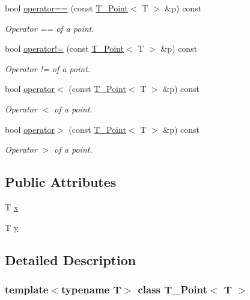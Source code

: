 \begin{DoxyCompactItemize}
\item 
bool \hyperlink{classT__Point_a83c15f53049523cc75c23350ceb4832a}{operator==} (const \hyperlink{classT__Point}{T\+\_\+\+Point}$<$ T $>$ \&p) const
\begin{DoxyCompactList}\small\item\em Operator == of a point. \end{DoxyCompactList}\item 
bool \hyperlink{classT__Point_ab92f1605c6f5008b42105b4c7a7fc1b2}{operator!=} (const \hyperlink{classT__Point}{T\+\_\+\+Point}$<$ T $>$ \&p) const
\begin{DoxyCompactList}\small\item\em Operator != of a point. \end{DoxyCompactList}\item 
bool \hyperlink{classT__Point_a95cb559fe5888b44481f6ad3aebabefe}{operator$<$} (const \hyperlink{classT__Point}{T\+\_\+\+Point}$<$ T $>$ \&p) const
\begin{DoxyCompactList}\small\item\em Operator $<$ of a point. \end{DoxyCompactList}\item 
bool \hyperlink{classT__Point_a0a9956de8ab7c8dccf35b78c43aedefd}{operator$>$} (const \hyperlink{classT__Point}{T\+\_\+\+Point}$<$ T $>$ \&p) const
\begin{DoxyCompactList}\small\item\em Operator $>$ of a point. \end{DoxyCompactList}\end{DoxyCompactItemize}
\subsection*{Public Attributes}
\begin{DoxyCompactItemize}
\item 
T \hyperlink{classT__Point_a45cc1c670a8d9bc786a38428cdce4bd2}{x}
\item 
T \hyperlink{classT__Point_a28da35a974844bdb3509a90345d3c1f9}{y}
\end{DoxyCompactItemize}


\subsection{Detailed Description}
\subsubsection*{template$<$typename T$>$\newline
class T\+\_\+\+Point$<$ T $>$}

